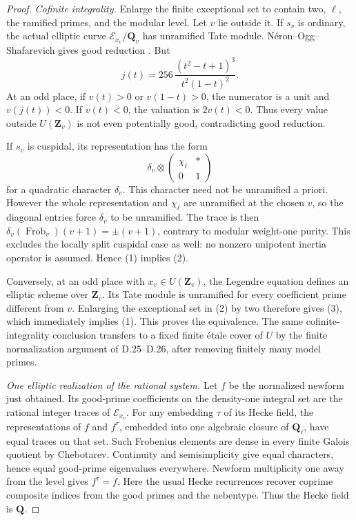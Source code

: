 \begin{proof}
\emph{Cofinite integrality.}
Enlarge the finite exceptional set to contain two, $\ell$,
the ramified primes, and the modular level. Let $v$ lie
outside it.
If $s_v$ is ordinary, the actual elliptic curve
$\mathcal E_{x_v}/\mathbf Q_v$ has unramified Tate module.
N\'eron--Ogg--Shafarevich gives good reduction
\citep[IV.1.3]{D_Serre1989}.
But
\[
 j(t)=256\,\frac{(t^2-t+1)^3}{t^2(1-t)^2}.
 \tag{D.30.2}
\]
At an odd place, if $v(t)>0$ or $v(1-t)>0$, the numerator
is a unit and $v(j(t))<0$. If $v(t)<0$, the valuation
is $2v(t)<0$. Thus every value outside $U(\mathbf Z_v)$
is not even potentially good, contradicting good reduction.

If $s_v$ is cuspidal, its representation has the form
\[
 \delta_v\otimes
 \begin{pmatrix}\chi_\ell& *\\0&1\end{pmatrix}
\]
for a quadratic character $\delta_v$. This character
need not be unramified a priori. However the whole
representation and $\chi_\ell$ are unramified at the
chosen $v$, so the diagonal entries force $\delta_v$
to be unramified. The trace is then
$\delta_v(\operatorname{Frob}_v)(v+1)=\pm(v+1)$,
contrary to modular weight-one purity.
This excludes the locally split cuspidal case as well:
no nonzero unipotent inertia operator is assumed.
Hence \textup{(1)} implies \textup{(2)}.

Conversely, at an odd place with $x_v\in U(\mathbf Z_v)$,
the Legendre equation defines an elliptic scheme over
$\mathbf Z_v$. Its Tate module is unramified for every
coefficient prime different from $v$.
Enlarging the exceptional set in \textup{(2)} by two
therefore gives \textup{(3)}, which immediately implies
\textup{(1)}. This proves the equivalence.
The same cofinite-integrality conclusion transfers to
a fixed finite \'etale cover of $U$ by the finite
normalization argument of D.25--D.26, after removing
finitely many model primes.

\emph{One elliptic realization of the rational system.}
Let $f$ be the normalized newform just obtained.
Its good-prime coefficients on the density-one integral
set are the rational integer traces of
$\mathcal E_{x_v}$.
For any embedding $\tau$ of its Hecke field, the
representations of $f$ and $f^\tau$, embedded into one
algebraic closure of $\mathbf Q_\ell$, have equal traces
on that set. Such Frobenius elements are dense in every
finite Galois quotient by Chebotarev. Continuity and
semisimplicity give equal characters, hence equal
good-prime eigenvalues everywhere.
Newform multiplicity one away from the level
\citep[Theorem~9.4 and the paragraph after Example~9.5]{D_Stein2007}
gives $f^\tau=f$. Here the usual Hecke recurrences
recover coprime composite indices from the good primes
and the nebentype. Thus the Hecke field is $\mathbf Q$.


\end{proof}
